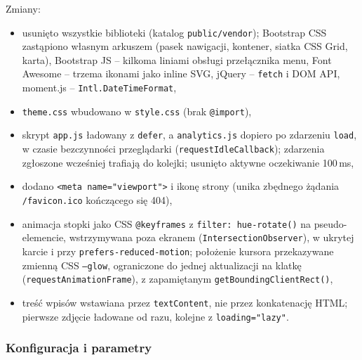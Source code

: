 Zmiany:
\begin{itemize}
  \item usunięto wszystkie biblioteki (katalog \texttt{public/vendor});
    Bootstrap CSS zastąpiono własnym arkuszem (pasek nawigacji, kontener, siatka CSS Grid, karta),
    Bootstrap JS -- kilkoma liniami obsługi przełącznika menu, Font Awesome -- trzema ikonami
    jako inline SVG, jQuery -- \texttt{fetch} i DOM API, moment.js -- \texttt{Intl.DateTimeFormat},
  \item \texttt{theme.css} wbudowano w \texttt{style.css} (brak \texttt{@import}),
  \item skrypt \texttt{app.js} ładowany z \texttt{defer}, a \texttt{analytics.js} dopiero po zdarzeniu
    \texttt{load}, w czasie bezczynności przeglądarki (\texttt{requestIdleCallback});
    zdarzenia zgłoszone wcześniej trafiają do kolejki; usunięto aktywne oczekiwanie 100\,ms,
  \item dodano \texttt{<meta name="viewport">} i ikonę strony (unika zbędnego żądania \texttt{/favicon.ico} kończącego się 404),
  \item animacja stopki jako CSS \texttt{@keyframes} z \texttt{filter: hue-rotate()}
    na pseudo-elemencie, wstrzymywana poza ekranem (\texttt{IntersectionObserver}),
    w ukrytej karcie i przy \texttt{prefers-reduced-motion}; położenie kursora
    przekazywane zmienną CSS \texttt{--glow}, ograniczone do jednej aktualizacji na klatkę
    (\texttt{requestAnimationFrame}), z zapamiętanym \texttt{getBoundingClientRect()},
  \item treść wpisów wstawiana przez \texttt{textContent}, nie przez konkatenację HTML;
    pierwsze zdjęcie ładowane od razu, kolejne z \texttt{loading="lazy"}.
\end{itemize}

\subsubsection{Konfiguracja i parametry}

